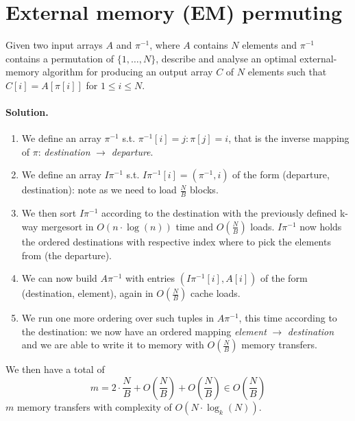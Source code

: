 \section{External memory (EM) permuting}
Given two input arrays $A$ and $\pi^{-1}$, where $A$ contains $N$ elements and $\pi^{-1}$ contains a permutation of $\{1, \dots, N\}$, describe and analyse an optimal external-memory algorithm for producing an output array $C$ of $N$ elements such that $C[i] = A[\pi[i]]$ for $1 \leq i \leq N$.

\vspace{0.5cm} \paragraph{Solution.}
\begin{enumerate}
\item We define an array $\pi^{-1}$ s.t. $\pi^{-1}[i] = j : \pi[j] = i$, that is the inverse mapping of $\pi$: \emph{destination} $\to$ \emph{departure}.
\item We define an array $I\pi^{-1}$ s.t. $I\pi^{-1}[i] = (\pi^{-1}, i)$ of the form (departure, destination): note as we need to load $\frac{N}{B}$ blocks.
\item We then sort $I\pi^{-1}$ according to the destination with the previously defined k-way mergesort in $O(n \cdot \log(n))$ time and $O(\frac{N}{B})$ loads.
$I\pi^{-1}$ now holds the ordered destinations with respective index where to pick the elements from (the departure).
\item We can now build $A\pi^{-1}$ with entries $(I\pi^{-1}[i], A[i])$ of the form (destination, element), again in $O(\frac{N}{B})$ cache loads.
\item We run one more ordering over such tuples in $A\pi^{-1}$, this time according to the destination: we now have an ordered mapping \emph{element} $\to$ \emph{destination} and we are able to write it to memory with $O(\frac{N}{B})$ memory transfers.
\end{enumerate}
We then have a total of
\begin{equation*}
m = 2 \cdot \frac{N}{B} + O(\frac{N}{B}) + O(\frac{N}{B}) \in O(\frac{N}{B})
\end{equation*}
$m$ memory transfers with complexity of $O(N \cdot \log_k(N))$.
